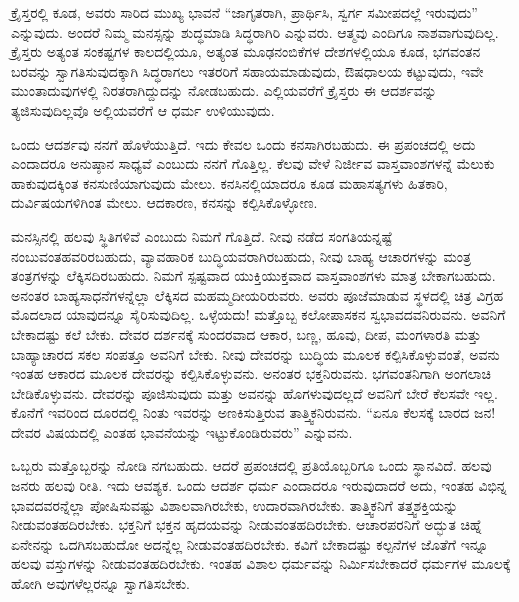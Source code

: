 
ಕ್ರೈಸ್ತರಲ್ಲಿ ಕೂಡ, ಅವರು ಸಾರಿದ ಮುಖ್ಯ ಭಾವನೆ “ಜಾಗೃತರಾಗಿ, ಪ್ರಾರ್ಥಿಸಿ, ಸ್ವರ್ಗ ಸಮೀಪದಲ್ಲೆ ಇರುವುದು” ಎನ್ನುವುದು. ಅಂದರೆ ನಿಮ್ಮ ಮನಸ್ಸನ್ನು ಶುದ್ಧಮಾಡಿ ಸಿದ್ಧರಾಗಿರಿ ಎನ್ನುವರು. ಆತ್ಮವು ಎಂದಿಗೂ ನಾಶವಾಗುವುದಿಲ್ಲ. ಕ್ರೈಸ್ತರು ಅತ್ಯಂತ ಸಂಕಷ್ಟಗಳ ಕಾಲದಲ್ಲಿಯೂ, ಅತ್ಯಂತ ಮೂಢನಂಬಿಕೆಗಳ ದೇಶಗಳಲ್ಲಿಯೂ ಕೂಡ, ಭಗವಂತನ ಬರವನ್ನು ಸ್ವಾಗತಿಸುವುದಕ್ಕಾಗಿ ಸಿದ್ಧರಾಗಲು ಇತರರಿಗೆ ಸಹಾಯಮಾಡುವುದು, ಔಷಧಾಲಯ ಕಟ್ಟುವುದು, ಇವೇ ಮುಂತಾದುವುಗಳಲ್ಲಿ ನಿರತರಾಗಿದ್ದುದನ್ನು ನೋಡಬಹುದು. ಎಲ್ಲಿಯವರೆಗೆ ಕ್ರೈಸ್ತರು ಈ ಆದರ್ಶವನ್ನು ತ್ಯಜಿಸುವುದಿಲ್ಲವೊ ಅಲ್ಲಿಯವರೆಗೆ ಆ ಧರ್ಮ ಉಳಿಯುವುದು.


ಒಂದು ಆದರ್ಶವು ನನಗೆ ಹೊಳೆಯುತ್ತಿದೆ. ಇದು ಕೇವಲ ಒಂದು ಕನಸಾಗಿರಬಹುದು. ಈ ಪ್ರಪಂಚದಲ್ಲಿ ಅದು ಎಂದಾದರೂ ಅನುಷ್ಠಾನ ಸಾಧ್ಯವೆ ಎಂಬುದು ನನಗೆ ಗೊತ್ತಿಲ್ಲ. ಕೆಲವು ವೇಳೆ ನಿರ್ಜೀವ ವಾಸ್ತವಾಂಶಗಳನ್ನೆ ಮೆಲುಕು ಹಾಕುವುದಕ್ಕಿಂತ ಕನಸುಣಿಯಾಗುವುದು ಮೇಲು. ಕನಸಿನಲ್ಲಿಯಾದರೂ ಕೂಡ ಮಹಾಸತ್ಯಗಳು ಹಿತಕಾರಿ, ದುರ್ವಿಷಯಗಳಿಗಿಂತ ಮೇಲು. ಆದಕಾರಣ, ಕನಸನ್ನು ಕಲ್ಪಿಸಿಕೊಳ್ಳೋಣ.


ಮನಸ್ಸಿನಲ್ಲಿ ಹಲವು ಸ್ಥಿತಿಗಳಿವೆ ಎಂಬುದು ನಿಮಗೆ ಗೊತ್ತಿದೆ. ನೀವು ನಡೆದ ಸಂಗತಿಯನ್ನಷ್ಟೆ ನಂಬುವಂತಹವರಿರಬಹುದು, ವ್ಯಾವಹಾರಿಕ ಬುದ್ಧಿಯವರಾಗಿರಬಹುದು, ನೀವು ಬಾಹ್ಯ ಆಚಾರಗಳನ್ನು ಮಂತ್ರ ತಂತ್ರಗಳನ್ನು ಲೆಕ್ಕಿಸದಿರಬಹುದು. ನಿಮಗೆ ಸ್ಪಷ್ಟವಾದ ಯುಕ್ತಿಯುಕ್ತವಾದ ವಾಸ್ತವಾಂಶಗಳು ಮಾತ್ರ ಬೇಕಾಗಬಹುದು. ಅನಂತರ ಬಾಹ್ಯಸಾಧನೆಗಳನ್ನೆಲ್ಲಾ ಲೆಕ್ಕಿಸದ ಮಹಮ್ಮದೀಯರಿರುವರು. ಅವರು ಪೂಜೆಮಾಡುವ ಸ್ಥಳದಲ್ಲಿ ಚಿತ್ರ ವಿಗ್ರಹ ಮೊದಲಾದ ಯಾವುದನ್ನೂ ಸೈರಿಸುವುದಿಲ್ಲ. ಒಳ್ಳೆಯದು! ಮತ್ತೊಬ್ಬ ಕಲೋಪಾಸಕನ ಸ್ವಭಾವದವನಿರುವನು. ಅವನಿಗೆ ಬೇಕಾದಷ್ಟು ಕಲೆ ಬೇಕು. ದೇವರ ದರ್ಶನಕ್ಕೆ ಸುಂದರವಾದ ಆಕಾರ, ಬಣ್ಣ, ಹೂವು, ದೀಪ, ಮಂಗಳಾರತಿ ಮತ್ತು ಬಾಹ್ಯಾಚಾರದ ಸಕಲ ಸಂಪತ್ತೂ ಅವನಿಗೆ ಬೇಕು. ನೀವು ದೇವರನ್ನು ಬುದ್ಧಿಯ ಮೂಲಕ ಕಲ್ಪಿಸಿಕೊಳ್ಳುವಂತೆ, ಅವನು ಇಂತಹ ಆಕಾರದ ಮೂಲಕ ದೇವರನ್ನು ಕಲ್ಪಿಸಿಕೊಳ್ಳುವನು. ಅನಂತರ ಭಕ್ತನಿರುವನು. ಭಗವಂತನಿಗಾಗಿ ಅಂಗಲಾಚಿ ಬೇಡಿಕೊಳ್ಳುವನು. ದೇವರನ್ನು ಪೂಜಿಸುವುದು ಮತ್ತು ಅವನನ್ನು ಹೊಗಳುವುದಲ್ಲದೆ ಅವನಿಗೆ ಬೇರೆ ಕೆಲಸವೇ ಇಲ್ಲ. ಕೊನೆಗೆ ಇವರಿಂದ ದೂರದಲ್ಲಿ ನಿಂತು ಇವರನ್ನು ಅಣಕಿಸುತ್ತಿರುವ ತಾತ್ತ್ವಿಕನಿರುವನು. “ಏನೂ ಕೆಲಸಕ್ಕೆ ಬಾರದ ಜನ! ದೇವರ ವಿಷಯದಲ್ಲಿ ಎಂತಹ ಭಾವನೆಯನ್ನು ಇಟ್ಟುಕೊಂಡಿರುವರು” ಎನ್ನುವನು.


ಒಬ್ಬರು ಮತ್ತೊಬ್ಬರನ್ನು ನೋಡಿ ನಗಬಹುದು. ಆದರೆ ಪ್ರಪಂಚದಲ್ಲಿ ಪ್ರತಿಯೊಬ್ಬರಿಗೂ ಒಂದು ಸ್ಥಾನವಿದೆ. ಹಲವು ಜನರು ಹಲವು ರೀತಿ. ಇದು ಆವಶ್ಯಕ. ಒಂದು ಆದರ್ಶ ಧರ್ಮ ಎಂದಾದರೂ ಇರುವುದಾದರೆ ಅದು, ಇಂತಹ ವಿಭಿನ್ನ ಭಾವದವರನ್ನೆಲ್ಲಾ ಪೋಷಿಸುವಷ್ಟು ವಿಶಾಲವಾಗಿರಬೇಕು, ಉದಾರವಾಗಿರಬೇಕು. ತಾತ್ತ್ವಿಕನಿಗೆ ತತ್ತ್ವಶಕ್ತಿಯನ್ನು ನೀಡುವಂತಹದಿರಬೇಕು. ಭಕ್ತನಿಗೆ ಭಕ್ತನ ಹೃದಯವನ್ನು ನೀಡುವಂತಹದಿರಬೇಕು. ಆಚಾರಪರನಿಗೆ ಅದ್ಭುತ ಚಿಹ್ನೆ ಏನೇನನ್ನು ಒದಗಿಸಬಹುದೋ ಅದನ್ನೆಲ್ಲ ನೀಡುವಂತಹದಿರಬೇಕು. ಕವಿಗೆ ಬೇಕಾದಷ್ಟು ಕಲ್ಪನೆಗಳ ಜೊತೆಗೆ ಇನ್ನೂ ಹಲವು ವಸ್ತುಗಳನ್ನು ನೀಡುವಂತಹದಿರಬೇಕು. ಇಂತಹ ವಿಶಾಲ ಧರ್ಮವನ್ನು ನಿರ್ಮಿಸಬೇಕಾದರೆ ಧರ್ಮಗಳ ಮೂಲಕ್ಕೆ ಹೋಗಿ ಅವುಗಳೆಲ್ಲರನ್ನೂ ಸ್ವಾಗತಿಸಬೇಕು.

